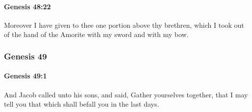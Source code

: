 		\paragraph{Genesis 48:22} %
			\label{GENESIS-48-22}

			Moreover I have given to thee one portion above thy brethren, which I took out of the hand of the Amorite with my sword and with my bow.

	\subsubsection{Genesis 49} %
		\label{GENESIS-49}

		\paragraph{Genesis 49:1} %
			\label{GENESIS-49-1}

			And Jacob called unto his sons, and said, Gather yourselves together, that I may tell you that which shall befall you in the last days.

